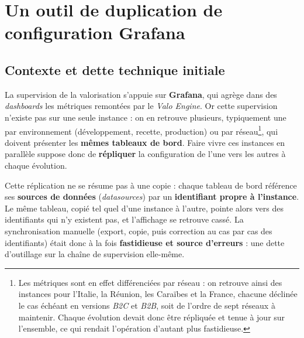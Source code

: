 \section{Un outil de duplication de configuration Grafana}
\label{chap:t1}


\subsection{Contexte et dette technique initiale}
La supervision de la valorisation s'appuie sur \textbf{Grafana}, qui agrège dans
des \emph{dashboards} les métriques remontées par le \emph{Valo Engine}. Or cette
supervision n'existe pas sur une seule instance : on en retrouve plusieurs,
typiquement une par environnement (développement, recette, production) ou par
réseau\footnote{Les métriques sont en effet différenciées par réseau : on
retrouve ainsi des instances pour l'Italie, la Réunion, les Caraïbes et la
France, chacune déclinée le cas échéant en versions \emph{B2C} et \emph{B2B},
soit de l'ordre de sept réseaux à maintenir. Chaque évolution devait donc être
répliquée et tenue à jour sur l'ensemble, ce qui rendait l'opération d'autant
plus fastidieuse.}, qui doivent présenter les \textbf{mêmes tableaux de bord}. Faire vivre
ces instances en parallèle suppose donc de \textbf{répliquer} la configuration de
l'une vers les autres à chaque évolution.

Cette réplication ne se résume pas à une copie : chaque tableau de bord référence
ses \textbf{sources de données} (\emph{datasources}) par un \textbf{identifiant
propre à l'instance}. Le même tableau, copié tel quel d'une instance à l'autre,
pointe alors vers des identifiants qui n'y existent pas, et l'affichage se
retrouve cassé. La synchronisation manuelle (export, copie, puis correction au
cas par cas des identifiants) était donc à la fois \textbf{fastidieuse et source
d'erreurs} : une dette d'outillage sur la chaîne de supervision elle-même.

